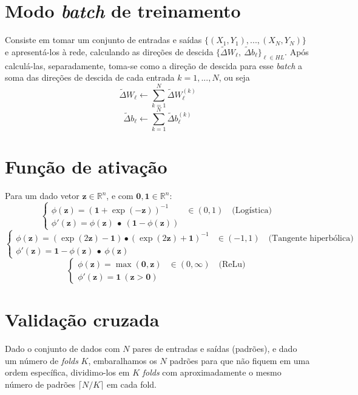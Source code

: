 \documentclass[12pt,a4paper]{article}
\def\RR{\mathbb{R}}
\begin{document}
\section{Modo \textit{batch} de treinamento}
Consiste em tomar um conjunto de entradas e saídas $\{(X_1,Y_1), ...,(X_N,Y_N)\}$ e apresentá-los à rede, calculando as direções de descida $\{\tilde\Delta W_\ell,\ \tilde\Delta b_\ell\}_{\ell\in HL}$. Após calculá-las, separadamente, toma-se como a direção de descida para esse \textit{batch} a soma das direções de descida de cada entrada $k=1,...,N$, ou seja
\[
\tilde\Delta W_\ell \gets \sum_{k=1}^{N}\tilde\Delta W_\ell^{(k)}
\]
\[
\tilde\Delta b_\ell \gets \sum_{k=1}^{N}\tilde\Delta b_\ell^{(k)}
\]




\section{Função de ativação}
Para um dado vetor $\mathbf{z}\in\RR^n$, e com $\mathbf{0,1}\in\RR^n$:
\def\z{\mathbf{z}}
\[
\begin{cases}
\phi(\z) = (\mathbf{1}+\exp(-\z))^{-1} &\in (0,1) \quad \mbox{(Logística)}\\
\phi'(\z) = \phi(\z) \ \bullet\ (\mathbf{1}-\phi(\z))
\end{cases}
\]
\[
\begin{cases}
\phi(\z) = (\exp(2\z)-\mathbf{1})\bullet(\exp(2\z)+\mathbf{1})^{-1} & \in (-1,1)\quad \mbox{(Tangente hiperbólica)}\\
\phi'(\z) = \mathbf{1}-\phi(\z)\ \bullet\ \phi(\z)
\end{cases}
\]
\[
\begin{cases}
\phi(\z) = \max(\mathbf{0},\z) & \in(0,\infty) \quad \mbox{(ReLu)}\\
\phi'(\z) = \mathbf{1}\ (\z>\mathbf{0})
\end{cases}
\]





\section{Validação cruzada}
Dado o conjunto de dados com $N$ pares de entradas e saídas (padrões), e dado um número de \textit{folds} $K$, embaralhamos os $N$ padrões para que não fiquem em uma ordem específica, dividimo-los em $K$ \textit{folds} com aproximadamente o mesmo número de padrões $\lceil N/K\rceil$ em cada fold.
\end{document}
